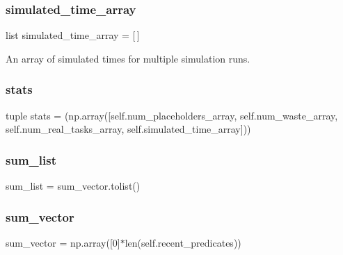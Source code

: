 \subsubsection{\texorpdfstring{simulated\_time\_array}{simulated\_time\_array}}
{\footnotesize\ttfamily list simulated\+\_\+time\+\_\+array = \mbox{[}$\,$\mbox{]}\hspace{0.3cm}{\ttfamily [static]}}



An array of simulated times for multiple simulation runs. 

\mbox{\label{classdynamicfilterapp_1_1test__simulations_1_1_simulation_test_a7735d195f566a3c7a06a23cecd0d22df}} 
\subsubsection{\texorpdfstring{stats}{stats}}
{\footnotesize\ttfamily tuple stats = (np.\+array(\mbox{[}self.\+num\+\_\+placeholders\+\_\+array, self.\+num\+\_\+waste\+\_\+array, self.\+num\+\_\+real\+\_\+tasks\+\_\+array, self.\+simulated\+\_\+time\+\_\+array\mbox{]}))\hspace{0.3cm}{\ttfamily [static]}}

\mbox{\label{classdynamicfilterapp_1_1test__simulations_1_1_simulation_test_af26c236cdeca420e57950e94386ca3c3}} 
\subsubsection{\texorpdfstring{sum\_list}{sum\_list}}
{\footnotesize\ttfamily sum\+\_\+list = sum\+\_\+vector.\+tolist()\hspace{0.3cm}{\ttfamily [static]}}

\mbox{\label{classdynamicfilterapp_1_1test__simulations_1_1_simulation_test_a418948863130332c47bda07a24a9866f}} 
\subsubsection{\texorpdfstring{sum\_vector}{sum\_vector}}
{\footnotesize\ttfamily sum\+\_\+vector = np.\+array(\mbox{[}0\mbox{]}$\ast$len(self.\+recent\+\_\+predicates))\hspace{0.3cm}{\ttfamily [static]}}


